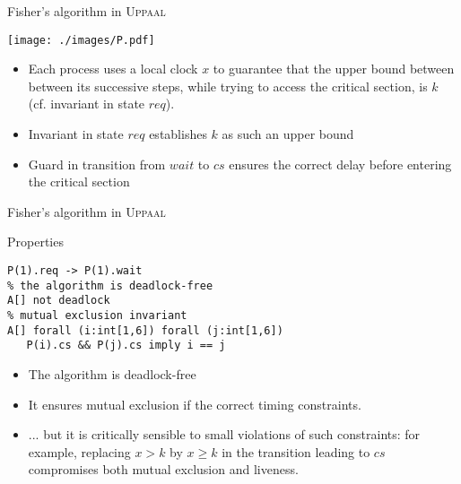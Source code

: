 \documentclass{beamer}
\def\dgold#1{{\darkgoldenrod #1}}
\begin{document}
\begin{slide}{Fisher's algorithm in \textsc{Uppaal}}
\small
\centering

\texttt{[image: ./images/P.pdf]} 


\begin{itemize}
\item Each process uses a local clock $x$ to guarantee that the upper bound between between its successive steps, while
trying to access the critical section, is $k$ (cf. \dgold{invariant} in state $req$).
\item \dgold{Invariant} in state $req$ establishes $k$ as such an upper bound
\item \dgold{Guard} in transition from $wait$ to $cs$ ensures the correct delay before entering the critical section
\end{itemize}
\end{slide}

\begin{frame}[fragile]{Fisher's algorithm in \textsc{Uppaal}}
\small

\begin{block}{Properties}
\begin{lstlisting}[emph={[2]forall,not}]
% P(1) requests access => it will eventually wait
P(1).req -> P(1).wait
% the algorithm is deadlock-free
A[] not deadlock
% mutual exclusion invariant
A[] forall (i:int[1,6]) forall (j:int[1,6])
   P(i).cs && P(j).cs imply i == j  
\end{lstlisting}
\end{block}

\begin{itemize}
\item The algorithm is \dgold{deadlock-free}
\item It ensures  mutual exclusion if the correct timing constraints. 
\item ... but it is critically sensible to  small violations of such constraints: for example, replacing $x > k$ by 
$x \geq k$ in the transition leading to $cs$ compromises both \dgold{mutual exclusion} and \dgold{liveness}.
\end{itemize}
\end{frame}
\end{document}
